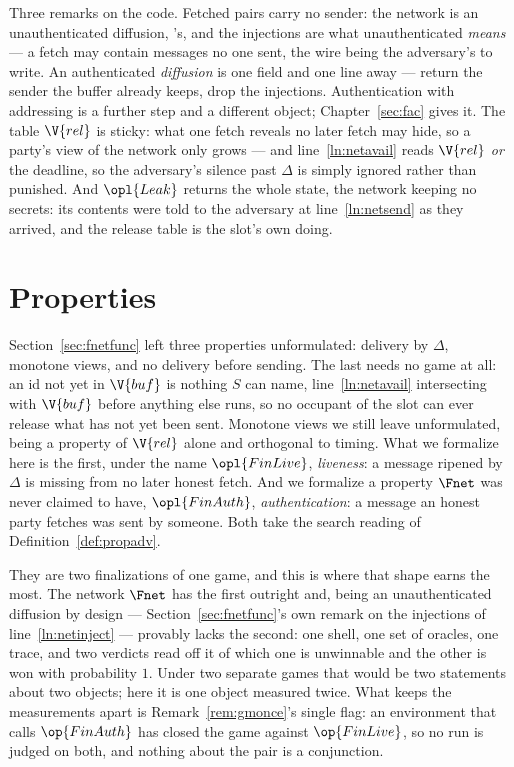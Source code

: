 \documentclass[10pt,oneside,openany]{book}
\theoremstyle{accentdef}
\theoremstyle{accentplain}
\begin{document}


Three remarks on the code. Fetched pairs carry no sender: the network is an unauthenticated
diffusion, \cite{BMTZ17}'s, and the injections are what unauthenticated \emph{means} --- a fetch
may contain messages no one sent, the wire being the adversary's to write. An authenticated
\emph{diffusion} is one field and one line away --- return the sender the buffer already keeps,
drop the injections. Authentication with addressing is a further step and a different object;
Chapter~\ref{sec:fac} gives it. The table $\V{rel}$ is sticky: what one fetch reveals no later fetch may hide, so a party's view
of the network only grows --- and line~\ref{ln:netavail} reads $\V{rel}$ \emph{or} the deadline,
so the adversary's silence past $\Delta$ is simply ignored rather than punished. And
$\opl{Leak}$ returns the whole state, the network keeping no secrets: its contents were told to
the adversary at line~\ref{ln:netsend} as they arrived, and the release table is the slot's own
doing.

\section{Properties}\label{sec:netprops}

Section~\ref{sec:fnetfunc} left three properties unformulated: delivery by $\Delta$, monotone
views, and no delivery before sending. The last needs no game at all: an id not yet in $\V{buf}$
is nothing $S$ can name, line~\ref{ln:netavail} intersecting with $\V{buf}$ before anything else
runs, so no occupant of the slot can ever release what has not yet been sent. Monotone views we
still leave unformulated, being a property of $\V{rel}$ alone and orthogonal to timing. What we
formalize here is the first, under the name $\opl{FinLive}$, \emph{liveness}: a message ripened
by $\Delta$ is missing from no later honest fetch. And we formalize a property $\Fnet$ was never
claimed to have, $\opl{FinAuth}$, \emph{authentication}: a message an honest party fetches was
sent by someone. Both take the search reading of Definition~\ref{def:propadv}.

They are two finalizations of one game, and this is where that shape earns the most. The network $\Fnet$ has
the first outright and, being an unauthenticated diffusion by design ---
Section~\ref{sec:fnetfunc}'s own remark on the injections of line~\ref{ln:netinject} ---
provably lacks the second: one shell, one set of oracles, one trace, and two verdicts read off it
of which one is unwinnable and the other is won with probability $1$. Under two separate games
that would be two statements about two objects; here it is one object measured twice. What keeps
the measurements apart is Remark~\ref{rem:gmonce}'s single flag: an environment that calls
$\op{FinAuth}$ has closed the game against $\op{FinLive}$, so no run is judged on both, and
nothing about the pair is a conjunction.
\end{document}
